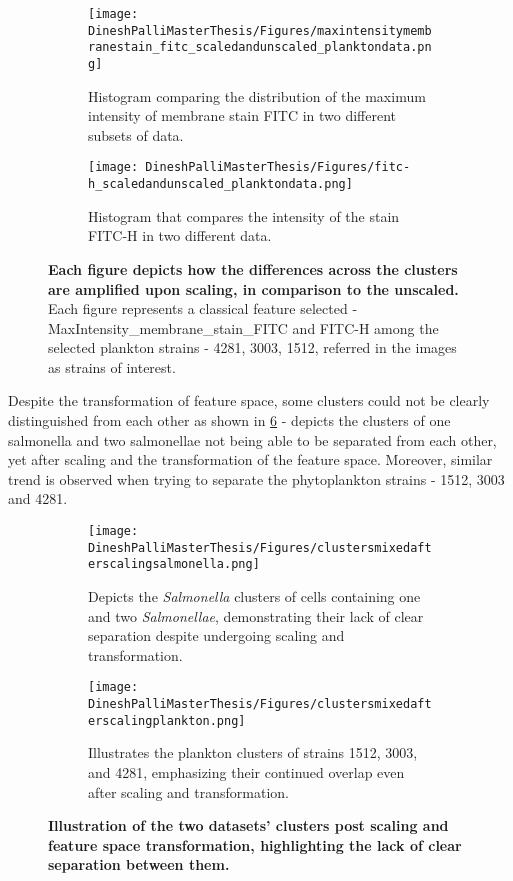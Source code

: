 \documentclass[12pt,a4paper]{article}
\begin{document}
\begin{figure}
  \centering
  \begin{subfigure}{0.45\linewidth}
    \texttt{[image: DineshPalliMasterThesis/Figures/maxintensitymembranestain\_fitc\_scaledandunscaled\_planktondata.png]}
    \caption{Histogram comparing the distribution of the maximum intensity of membrane stain FITC in two different subsets of data.}
    \label{multifig2:image_a}
  \end{subfigure}
  \hfill
  \begin{subfigure}{0.4\linewidth}
    \texttt{[image: DineshPalliMasterThesis/Figures/fitc-h\_scaledandunscaled\_planktondata.png]}
    \caption{Histogram that compares the intensity of the stain FITC-H in two different data.}
    \label{multifig2:image_b}
  \end{subfigure}
  \caption[Histograms comparing the features' intensity pre and post scaling]{\textbf{Each figure depicts how the differences across the clusters are amplified upon scaling, in comparison to the unscaled.} Each figure represents a classical feature selected - MaxIntensity\_membrane\_stain\_FITC and FITC-H among the selected plankton strains - 4281, 3003, 1512, referred in the images as strains of interest.}
  \label{multifig2:overall_figure}
\end{figure}

Despite the transformation of feature space, some clusters could not be clearly distinguished from each other as shown in \ref{multifig3:overall_figure} - depicts the clusters of one salmonella and two salmonellae not being able to be separated from each other, yet after scaling and the transformation of the feature space. Moreover, similar trend is observed when trying to separate the phytoplankton strains - 1512, 3003 and 4281.

\begin{figure}
  \centering
  \begin{subfigure}{0.5\linewidth}
    \texttt{[image: DineshPalliMasterThesis/Figures/clustersmixedafterscalingsalmonella.png]}
    \caption{Depicts the \textit{Salmonella} clusters of cells containing one and two \textit{Salmonellae}, demonstrating their lack of clear separation despite undergoing scaling and transformation.}
    \label{multifig3:image_a}
  \end{subfigure}
  \hfill
  \begin{subfigure}{0.5\linewidth}
    \texttt{[image: DineshPalliMasterThesis/Figures/clustersmixedafterscalingplankton.png]}
    \caption{Illustrates the plankton clusters of strains 1512, 3003, and 4281, emphasizing their continued overlap even after scaling and transformation.}
    \label{multifig3:image_b}
  \end{subfigure}
\caption[Plots highlighting the lack of cluster separation among \textit{Salmonella} one and two, and phytoplankton strains 1512, 3003, 4281.]{\textbf{Illustration of the two datasets' clusters post scaling and feature space transformation, highlighting the lack of clear separation between them.}}
\label{multifig3:overall_figure}
\end{figure}
\end{document}
